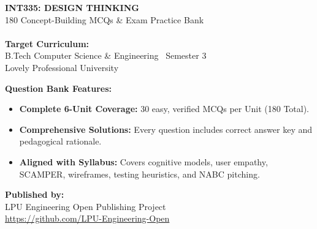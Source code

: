 \begin{titlepage}
\pagecolor{LightBg}
\begin{flushleft}
    \vspace*{1.5cm}
    {\Huge\bfseries\sffamily\color{BrandNavy} INT335: DESIGN THINKING}\\[0.4cm]
    {\LARGE\sffamily\color{BrandOrange} 180 Concept-Building MCQs \& Exam Practice Bank}\\[0.8cm]
    \noindent{\color{BrandOrange}\rule{\linewidth}{2.5pt}}\\[1.2cm]
    
    {\large\sffamily\textbf{Target Curriculum:}}\\
    {\normalsize\sffamily B.Tech Computer Science \& Engineering \textbar\ Semester 3}\\
    {\normalsize\sffamily Lovely Professional University}\\[1.5cm]
    
    \begin{tcolorbox}[enhanced, colback=white, colframe=BrandNavy, boxrule=1.5pt, arc=4pt, width=0.95\linewidth]
        \sffamily\bfseries\large Question Bank Features:
        \begin{itemize}[leftmargin=1.2em, itemsep=3pt, topsep=4pt]
            \item \textbf{Complete 6-Unit Coverage:} 30 easy, verified MCQs per Unit (180 Total).
            \item \textbf{Comprehensive Solutions:} Every question includes correct answer key and pedagogical rationale.
            \item \textbf{Aligned with Syllabus:} Covers cognitive models, user empathy, SCAMPER, wireframes, testing heuristics, and NABC pitching.
        \end{itemize}
    \end{tcolorbox}
    
    \vfill
    
    {\sffamily\small\textbf{Published by:}\\
    LPU Engineering Open Publishing Project\\
    \url{https://github.com/LPU-Engineering-Open}}
\end{flushleft}
\end{titlepage}
\nopagecolor
{}
